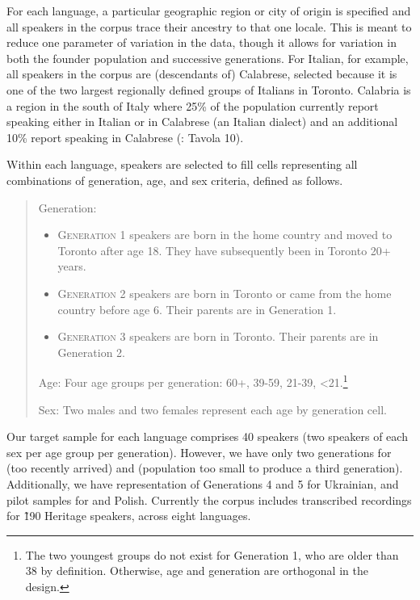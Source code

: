 \documentclass[output=paper]{LSP/langsci}
\begin{document}
For each language, a particular geographic region or city of origin is specified and all speakers in the corpus trace their ancestry to that one locale. This is meant to reduce one parameter of variation in the data, though it allows for variation in both the founder population and successive generations. For Italian, for example, all speakers in the corpus are (descendants of) Calabrese, selected because it is one of the two largest regionally defined groups of Italians in Toronto. Calabria is a region in the south of Italy where 25\% of the population currently report speaking either in Italian or in Calabrese (an Italian dialect) and an additional 10\% report speaking in Calabrese (\citealt{istat_istituto_nazionale_di_statistica_lingua_2007}: Tavola 10). 

Within each language, speakers are selected to fill cells representing all combinations of generation, age, and sex criteria, defined as follows. 

\begin{quote}
Generation:

\begin{itemize}
\item \textsc{Generation 1} speakers are born in the home country and moved to Toronto after age 18. They have subsequently been in Toronto 20+ years.

\item \textsc{Generation 2} speakers are born in Toronto or came from the home country before age 6. Their parents are in Generation 1.

\item \textsc{Generation 3} speakers are born in Toronto. Their parents are in Generation 2.
\end{itemize}

Age: Four age groups per generation: 60+, 39-59, 21-39, {\textless}21.\footnote{The two youngest groups do not exist for Generation 1, who are older than 38 by definition. Otherwise, age and generation are orthogonal in the design.} 

Sex: Two males and two females represent each age by generation cell.
\end{quote}

Our target sample for each language comprises 40 speakers (two speakers of each sex per age group per generation). However, we have only two generations for  (too recently arrived) and  (population too small to produce a third generation). Additionally, we have representation of Generations 4 and 5 for Ukrainian, and pilot samples for  and Polish. Currently the corpus includes transcribed recordings for \~190 Heritage speakers, across eight languages.
\end{document}
